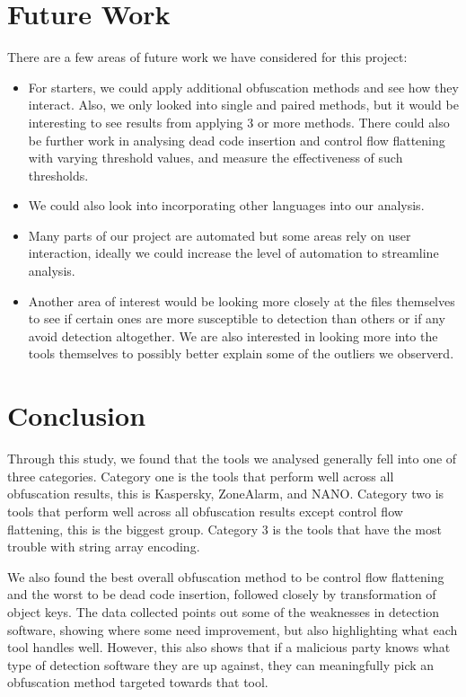 \documentclass[sigplan,10pt,review, nonacm=true]{acmart}\settopmatter{printfolios=true,printccs=false,printacmref=false}
\begin{document}
\section{Future Work}

There are a few areas of future work we have considered for this project:

\begin{itemize}
    \item For starters, we could apply additional obfuscation methods and see how they interact. Also, we only looked into single and paired methods, but it would be interesting to see results from applying 3 or more methods. There could also be further work in analysing dead code insertion and control flow flattening with varying threshold values, and measure the effectiveness of such thresholds.
    \item We could also look into incorporating other languages into our analysis.
    \item Many parts of our project are automated but some areas rely on user interaction, ideally we could increase the level of automation to streamline analysis.
    \item Another area of interest would be looking more closely at the files themselves to see if certain ones are more susceptible to detection than others or if any avoid detection altogether. We are also interested in looking more into the tools themselves to possibly better explain some of the outliers we observerd.
\end{itemize}

\section{Conclusion}

Through this study, we found that the tools we analysed generally fell into one of three categories. Category one is the tools that perform well across all obfuscation results, this is Kaspersky, ZoneAlarm, and NANO. Category two is tools that perform well across all obfuscation results except control flow flattening, this is the biggest group. Category 3 is the tools that have the most trouble with string array encoding.

We also found the best overall obfuscation method to be control flow flattening and the worst to be dead code insertion, followed closely by transformation of object keys. The data collected points out some of the weaknesses in detection software, showing where some need improvement, but also highlighting what each tool handles well. However, this also shows that if a malicious party knows what type of detection software they are up against, they can meaningfully pick an obfuscation method targeted towards that tool.
\end{document}
